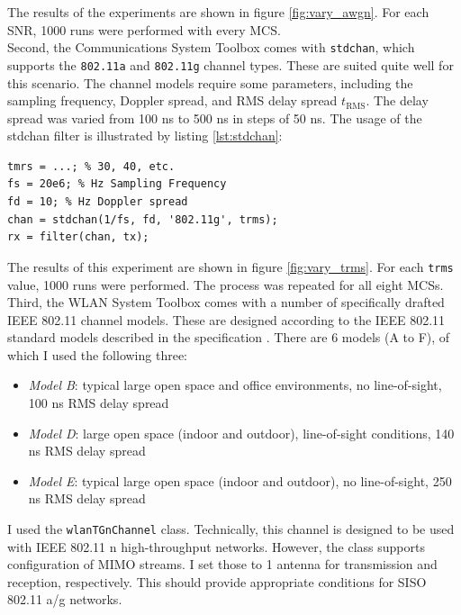 The results of the experiments are shown in figure \ref{fig:vary_awgn}. For each \gls{SNR}, 1000 runs were performed with every \gls{MCS}.\\

Second, the Communications System Toolbox comes with \texttt{stdchan}, which supports the \texttt{802.11a} and \texttt{802.11g} channel types. These are suited quite well for this scenario. The channel models require some parameters, including the sampling frequency, Doppler spread, and \gls{RMS} delay spread $ t_{\text{RMS}} $. The delay spread was varied from 100 ns to 500 ns in steps of 50 ns. The usage of the stdchan filter is illustrated by listing \ref{lst:stdchan}:

\begin{lstlisting}[captionpos=b,caption={Matlab stdchan Channel Model},label=lst:stdchan]
tmrs = ...; % 30, 40, etc.
fs = 20e6; % Hz Sampling Frequency
fd = 10; % Hz Doppler spread
chan = stdchan(1/fs, fd, '802.11g', trms);
rx = filter(chan, tx);
\end{lstlisting}

The results of this experiment are shown in figure \ref{fig:vary_trms}. For each \texttt{trms} value, 1000 runs were performed. The process was repeated for all eight \glspl{MCS}.\\

Third, the WLAN System Toolbox comes with a number of specifically drafted IEEE 802.11 channel models. These are designed according to the IEEE 802.11 standard models described in the specification \cite{ieee2012}. There are 6 models (A to F), of which I used the following three:

\begin{itemize}
	\item \textit{Model B}: typical large open space and office environments, no line-of-sight, 100 ns \gls{RMS} delay spread
	\item \textit{Model D}: large open space (indoor and outdoor), line-of-sight conditions, 140 ns \gls{RMS} delay spread
	\item \textit{Model E}: typical large open space (indoor and outdoor), no line-of-sight, 250 ns \gls{RMS} delay spread
\end{itemize}

I used the \texttt{wlanTGnChannel} class. Technically, this channel is designed to be used with IEEE 802.11 n high-throughput networks. However, the class supports configuration of \gls{MIMO} streams. I set those to 1 antenna for transmission and reception, respectively. This should provide appropriate conditions for \gls{SISO} 802.11 a/g networks.

